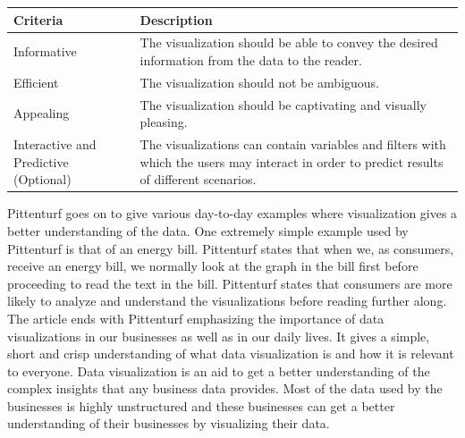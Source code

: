 \documentclass[]{book}
\theoremstyle{definition}
\theoremstyle{definition}
\theoremstyle{definition}
\theoremstyle{remark}
\begin{document}
\begin{longtable}[]{@{}ll@{}}
\toprule
\begin{minipage}[b]{0.16\columnwidth}\raggedright\strut
\textbf{Criteria}\strut
\end{minipage} & \begin{minipage}[b]{0.78\columnwidth}\raggedright\strut
\textbf{Description}\strut
\end{minipage}\tabularnewline
\midrule
\endhead
\begin{minipage}[t]{0.16\columnwidth}\raggedright\strut
Informative\strut
\end{minipage} & \begin{minipage}[t]{0.78\columnwidth}\raggedright\strut
The visualization should be able to convey the desired information from
the data to the reader.\strut
\end{minipage}\tabularnewline
\begin{minipage}[t]{0.16\columnwidth}\raggedright\strut
Efficient\strut
\end{minipage} & \begin{minipage}[t]{0.78\columnwidth}\raggedright\strut
The visualization should not be ambiguous.\strut
\end{minipage}\tabularnewline
\begin{minipage}[t]{0.16\columnwidth}\raggedright\strut
Appealing\strut
\end{minipage} & \begin{minipage}[t]{0.78\columnwidth}\raggedright\strut
The visualization should be captivating and visually pleasing.\strut
\end{minipage}\tabularnewline
\begin{minipage}[t]{0.16\columnwidth}\raggedright\strut
Interactive and Predictive (Optional)\strut
\end{minipage} & \begin{minipage}[t]{0.78\columnwidth}\raggedright\strut
The visualizations can contain variables and filters with which the
users may interact in order to predict results of different
scenarios.\strut
\end{minipage}\tabularnewline
\bottomrule
\end{longtable}

Pittenturf goes on to give various day-to-day examples where
visualization gives a better understanding of the data. One extremely
simple example used by Pittenturf is that of an energy bill. Pittenturf
states that when we, as consumers, receive an energy bill, we normally
look at the graph in the bill first before proceeding to read the text
in the bill. Pittenturf states that consumers are more likely to analyze
and understand the visualizations before reading further along. The
article ends with Pittenturf emphasizing the importance of data
visualizations in our businesses as well as in our daily lives. It gives
a simple, short and crisp understanding of what data visualization is
and how it is relevant to everyone. Data visualization is an aid to get
a better understanding of the complex insights that any business data
provides. Most of the data used by the businesses is highly unstructured
and these businesses can get a better understanding of their businesses
by visualizing their data.
\end{document}
